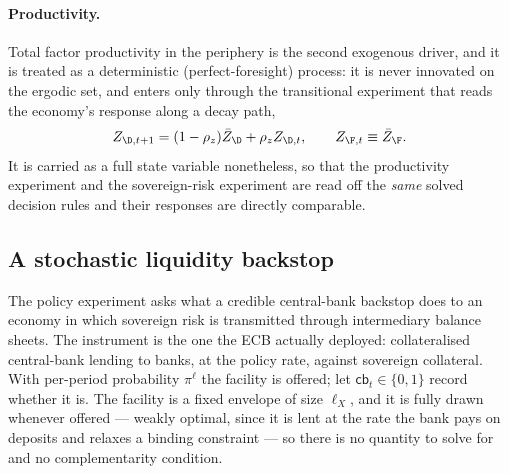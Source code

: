 \paragraph{Productivity.} Total factor productivity in the periphery is the
second exogenous driver, and it is treated as a deterministic (perfect-foresight)
process: it is never innovated on the ergodic set, and enters only through the
transitional experiment that reads the economy's response along a decay path,
\begin{equation}
Z_{\D,t+1}=(1-\rho_z)\bar Z_\D+\rho_z Z_{\D,t},
\qquad Z_{\F,t}\equiv\bar Z_\F .
\label{eq:z-process}
\end{equation}
It is carried as a full state variable nonetheless, so that the
productivity experiment and the sovereign-risk experiment are read off the
\emph{same} solved decision rules and their responses are directly comparable.


\subsection{A stochastic liquidity backstop}
\label{sec:ltro}

The policy experiment asks what a credible central-bank backstop does to an
economy in which sovereign risk is transmitted through intermediary balance
sheets. The instrument is the one the ECB actually deployed: collateralised
central-bank lending to banks, at the policy rate, against sovereign collateral.
With per-period probability $\pi^{\ell}$ the facility is offered; let
$\mathsf{cb}_t\in\{0,1\}$ record whether it is. The facility is a fixed envelope
of size $\ell_X$, and it is fully drawn whenever offered --- weakly optimal, since
it is lent at the rate the bank pays on deposits and relaxes a binding
constraint --- so there is no quantity to solve for and no complementarity
condition.

